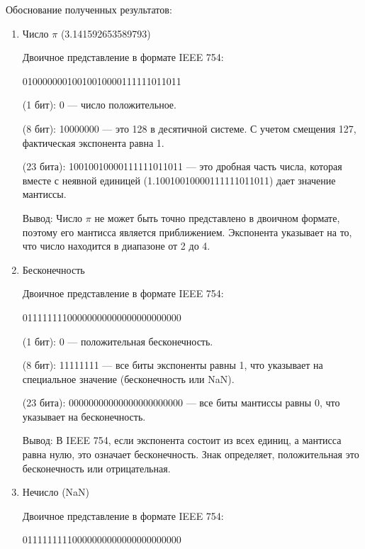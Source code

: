 \documentclass{report}
\begin{document}
	
	Обоснование полученных результатов:
	\begin{enumerate}
		\item{Число $\pi$ (3.141592653589793)}
		
		Двоичное представление в формате IEEE 754:
		\begin{center}
			01000000010010010000111111011011
		\end{center}
		
		\begin{itemize}
			 (1 бит): 0 — число положительное.
			
			 (8 бит): 10000000 — это 128 в десятичной системе. С учетом смещения 127, фактическая экспонента равна 1.
			
			 (23 бита): 10010010000111111011011 — это дробная часть числа, которая вместе с неявной единицей (1.10010010000111111011011) дает значение мантиссы.
		\end{itemize}
		
		Вывод: Число $\pi$ не может быть точно представлено в двоичном формате, поэтому его мантисса является приближением. Экспонента указывает на то, что число находится в диапазоне от 2 до 4.
		
		\item{Бесконечность}
		
		Двоичное представление в формате IEEE 754:
		\begin{center}
			01111111100000000000000000000000
		\end{center}
		
		\begin{itemize}
			 (1 бит): 0 — положительная бесконечность.
			
			 (8 бит): 11111111 — все биты экспоненты равны 1, что указывает на специальное значение (бесконечность или NaN).
			
			 (23 бита): 00000000000000000000000 — все биты мантиссы равны 0, что указывает на бесконечность.
		\end{itemize}
		
		Вывод: В IEEE 754, если экспонента состоит из всех единиц, а мантисса равна нулю, это означает бесконечность. Знак определяет, положительная это бесконечность или отрицательная.
		
		\item{Нечисло (NaN)}
		
		Двоичное представление в формате IEEE 754:
		\begin{center}
			01111111110000000000000000000000
		\end{center}
		

\end{enumerate}
\end{document}

